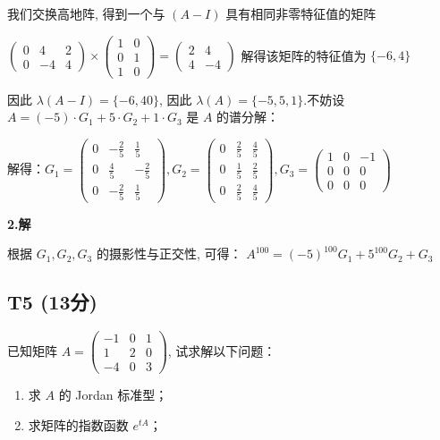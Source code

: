 \documentclass{article}
\begin{document}
我们交换高地阵, 得到一个与 $(A-I)$ 具有相同非零特征值的矩阵

$ \begin{pmatrix}
	0 & 4 & 2\\
	0 & -4 & 4
\end{pmatrix}\times \begin{pmatrix}
1 & 0\\
0 & 1\\
1 & 0
\end{pmatrix}=\begin{pmatrix}
	2 & 4 \\
	4 & -4
\end{pmatrix}$ 解得该矩阵的特征值为 $\{-6, 4\}$

因此 $\lambda(A-I)=\{-6, 4 0\}$, 因此 $\lambda(A)=\{-5, 5, 1\}$.不妨设 $A=(-5)\cdot G_1 + 5\cdot G_2 + 1\cdot G_3$ 是 $A$ 的谱分解：

解得：$G_1=\begin{pmatrix}
	0 & -\frac{2}{5} & \frac{1}{5}\\
	0 & \frac{4}{5} & -\frac{2}{5}\\
	0 & -\frac{2}{5} & \frac{1}{5}
\end{pmatrix}, G_2=\begin{pmatrix}
	0 & \frac{2}{5} & \frac{4}{5}\\
	0 & \frac{1}{5} & \frac{2}{5}\\
	0 & \frac{2}{5} & \frac{4}{5}
\end{pmatrix}, G_3=\begin{pmatrix}
	1 & 0 & -1\\
	0 & 0 & 0\\
	0 & 0 & 0
\end{pmatrix}$

\par \textbf{2.解}

根据 $G_1, G_2, G_3$ 的摄影性与正交性, 可得： $A^{100}=(-5)^{100}G_1+5^{100}G_2 + G_3$

\subsection{T5 (13分)}

\par 已知矩阵 $A=\begin{pmatrix}
	-1 & 0 & 1\\
	1 & 2 & 0\\
	-4 & 0 & 3
\end{pmatrix}$, 试求解以下问题：

\begin{enumerate}
	\item 求 $A$ 的 Jordan 标准型；
	\item 求矩阵的指数函数 $e^{tA}$；
\end{enumerate}
\end{document}

